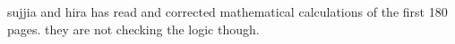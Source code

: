 sujjia and hira has read and corrected mathematical calculations of the first 180 pages. they are not checking the logic though.
